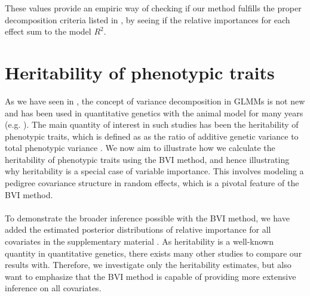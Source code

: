 \noindent These values provide an empiric way of checking if our method fulfills the proper decomposition criteria listed in , by seeing if the relative importances for each effect sum to the model $R^2$.


\section{Heritability of phenotypic traits}
\label{sec:heritability_method}
As we have seen in , the concept of variance decomposition in GLMMs is not new and has been used in quantitative genetics with the animal model for many years (e.g. \citet{Kruuk2004}). The main quantity of interest in such studies has been the heritability of phenotypic traits, which is defined as as the ratio of additive genetic variance to total phenotypic variance \citep{Wilson_heritability}. We now aim to illustrate how we calculate the heritability of phenotypic traits using the BVI method, and hence illustrating why heritability is a special case of variable importance. This involves modeling a pedigree covariance structure in random effects, which is a pivotal feature of the BVI method.
\\
\\
To demonstrate the broader inference possible with the BVI method, we have added the estimated posterior distributions of relative importance for all covariates in the supplementary material . As heritability is a well-known quantity in quantitative genetics, there exists many other studies to compare our results with. Therefore, we investigate only the heritability estimates, but also want to emphasize that the BVI method is capable of providing more extensive inference on all covariates. 
